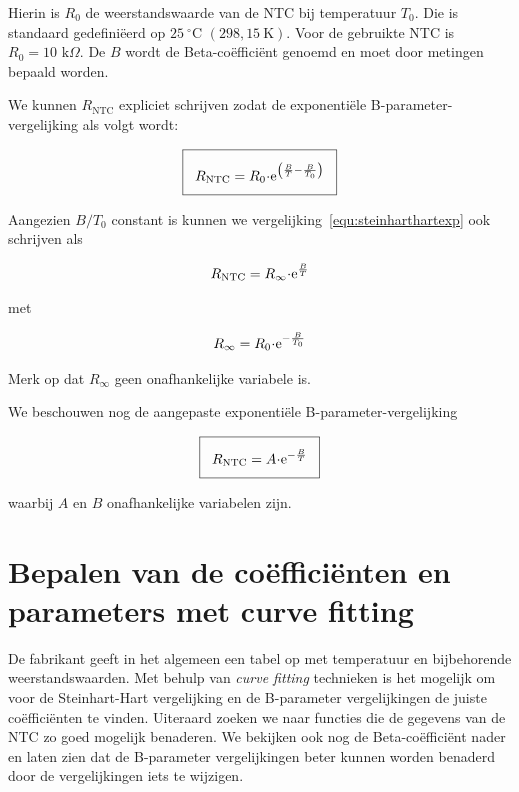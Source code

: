 \documentclass[12pt,a4paper,final,twoside,fleqn]{article}
\newcommand{\rntc}{R_\text{NTC}}
\let\oldcdot\cdot
\renewcommand{\cdot}{\kern-.10em\oldcdot\kern-.10em}
\begin{document}
Hierin is $R_0$ de weerstandswaarde van de NTC bij temperatuur $T_0$. Die is standaard
gedefini\"eerd op $25\:^\circ\text{C}$ $(298,15\: \text{K})$. Voor de gebruikte NTC
is $R_0 = 10\text{ k}\Omega$.
De $B$ wordt de Beta-co\"effici\"ent genoemd en  moet door metingen bepaald worden.

We kunnen $\rntc$ expliciet schrijven zodat de exponenti\"ele B-parameter-vergelijking
als volgt wordt:

\begin{equation}
\label{equ:steinharthartexp}
\setlength\fboxsep{2ex}
\boxed{R_\text{NTC} = R_0\cdot\text{e}^{\left(\frac{B}{T}-\frac{B}{T_0}\right)}}
\end{equation}

Aangezien $B/T_0$ constant is kunnen we vergelijking~\eqref{equ:steinharthartexp}
ook schrijven als

\begin{equation}
\label{equ:betafuncexp}
R_\text{NTC} = R_\infty \cdot\text{e}^\frac{B}{T}
\end{equation}

met

\begin{equation}
R_\infty = R_0\cdot \text{e}^{-\frac{B}{T_0}}
\end{equation}

Merk op dat $R_\infty$ geen onafhankelijke variabele is.

We beschouwen nog de aangepaste exponenti\"ele B-parameter-vergelijking

\begin{equation}
\label{equ:steinharthartexpadapt}
\setlength\fboxsep{2ex}
\boxed{\rntc = A\cdot\text{e}^{-\frac{B}{T}}}
\end{equation}

waarbij $A$ en $B$ onafhankelijke variabelen zijn.

\clearpage
\section{Bepalen van de co\"effici\"enten en parameters met curve fitting}
\label{sec:bepalenparameters}
De fabrikant geeft in het algemeen een tabel op met temperatuur en bijbehorende
weerstandswaarden. Met behulp van \textsl{curve fitting} technieken is het
mogelijk om voor de Steinhart-Hart vergelijking en de B-parameter vergelijkingen
de juiste co\"effici\"enten te vinden. Uiteraard zoeken we naar functies die de
gegevens van de NTC zo goed mogelijk benaderen. We bekijken ook nog de
Beta-co\"effici\"ent nader en laten zien dat de B-parameter vergelijkingen
beter kunnen worden benaderd door de vergelijkingen iets te wijzigen.
\end{document}
